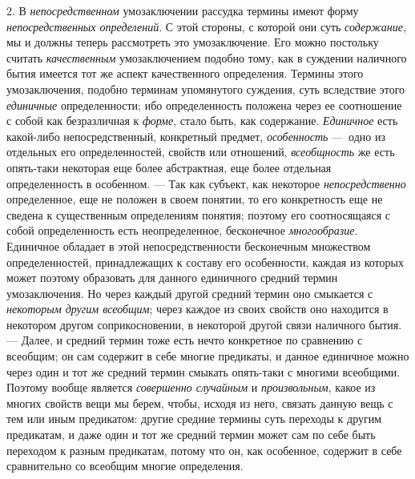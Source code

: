 \documentclass[twoside]{article}
\begin{document}
{{{2. В
{\em непосредственном}
умозаключении рассудка термины имеют форму
{\em непосредственных определений}.
С этой стороны, с которой они суть
{\em содержание}, мы и
должны теперь рассмотреть это умозаключение. Его можно постольку считать
{\em качественным}
умозаключением подобно тому, как в суждении наличного бытия
имеется тот же аспект качественного определения. Термины этого
умозаключения, подобно терминам упомянутого суждения, суть вследствие этого
{\em единичные}
определенности; ибо определенность положена через ее
соотношение с собой как безразличная к
{\em форме}, стало быть,
как содержание. {\em Единичное}
есть какой-либо непосредственный, конкретный предмет,
{\em особенность} —~одно
из отдельных его определенностей, свойств или отношений,
{\em всеобщность} же есть
опять-таки некоторая еще более абстрактная, еще более отдельная
определенность в особенном. — Так как субъект, как некоторое
{\em непосредственно}
определенное, еще не положен в своем понятии, то его
конкретность еще не сведена к существенным определениям понятия; поэтому
его соотносящаяся с собой определенность есть
неопределенное, бесконечное
{\em многообразие}.
Единичное обладает в этой непосредственности бесконечным
множеством определенностей, принадлежащих к составу его особенности, каждая
из которых может поэтому образовать для данного единичного средний термин
умозаключения. Но через каждый другой средний термин оно смыкается с
{\em некоторым другим всеобщим};
через каждое из своих свойств оно находится в некотором
другом соприкосновении, в некоторой другой связи наличного бытия. —
Далее, и средний термин тоже есть нечто конкретное по
сравнению с всеобщим; он сам содержит в себе многие предикаты, и данное
единичное можно через один и тот же средний термин смыкать опять-таки с
многими всеобщими. Поэтому вообще является
{\em совершенно случайным}
и {\em произвольным},
какое из многих свойств вещи мы берем, чтобы, исходя из него,
связать данную вещь с тем или иным предикатом: другие средние термины суть
переходы к другим предикатам, и даже один и тот же средний термин может сам
по себе быть переходом к разным предикатам, потому что он, как особенное,
содержит в себе сравнительно со всеобщим многие определения.

}}}
\end{document}
